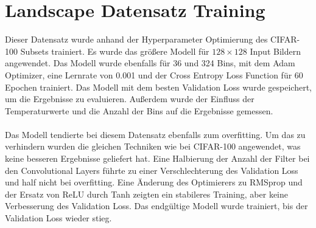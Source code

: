 \section{Landscape Datensatz Training}
Dieser Datensatz wurde anhand der Hyperparameter Optimierung des CIFAR-100 Subsets trainiert. Es wurde das größere Modell für $128 \times 128$
Input Bildern angewendet. Das Modell wurde ebenfalls für 36 und 324 Bins, mit dem Adam Optimizer, eine Lernrate von 0.001 und der Cross Entropy 
Loss Function für 60 Epochen trainiert. Das Modell mit dem besten Validation Loss wurde gespeichert, um die Ergebnisse zu evaluieren. Außerdem
wurde der Einfluss der Temperaturwerte und die Anzahl der Bins auf die Ergebnisse gemessen.
\\
\\
Das Modell tendierte bei diesem Datensatz ebenfalls zum \gls{overfitting}. Um das zu verhindern wurden die gleichen Techniken wie bei CIFAR-100
angewendet, was keine besseren Ergebnisse geliefert hat. Eine Halbierung der Anzahl der Filter bei den Convolutional Layers führte zu einer Verschlechterung
des Validation Loss und half nicht bei \gls{overfitting}. Eine Änderung des Optimierers zu RMSprop und der Ersatz von ReLU durch Tanh zeigten
ein stabileres Training, aber keine Verbesserung des Validation Loss. Das endgültige Modell wurde trainiert, bis der Validation Loss wieder stieg.

